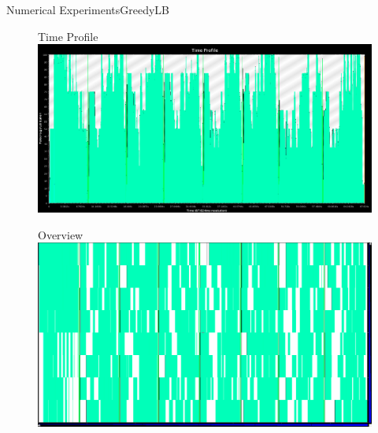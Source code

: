 \documentclass[]{beamer}
\begin{document}
\begin{frame}{Numerical Experiments}{GreedyLB}
  \begin{figure}{Time Profile}
    \includegraphics[width=.65\paperwidth,height=.35\paperheight]{figures/LoadBalancing/TimeProfileGreedyLB}
  \end{figure}
  \begin{figure}{\hspace{15pt}Overview}
    \includegraphics[width=.65\paperwidth,height=.35\paperheight]{figures/LoadBalancing/OverviewGreedyLB}
  \end{figure}
\end{frame}
\end{document}
